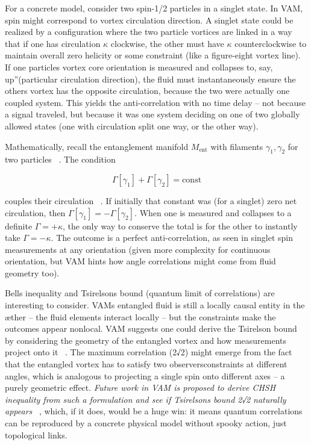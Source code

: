 \documentclass[a4paper, aps,preprint,superscriptaddress, 12pt]{revtex4}
\begin{document}
For a concrete model, consider two spin-1/2 particles in a singlet state. In VAM, spin might correspond to vortex circulation direction. A singlet state could be realized by a configuration where the two particle vortices are linked in a way that if one has circulation $\kappa$ clockwise, the other must have $\kappa$ counterclockwise to maintain overall zero helicity or some constraint (like a figure-eight vortex line). If one particle\rqs s vortex core orientation is measured and collapses to, say, \grqq up\textquotedblright (particular circulation direction), the fluid must instantaneously ensure the other\rqs s vortex has the opposite circulation, because the two were actually one coupled system. This yields the anti-correlation with no time delay – not because a signal traveled, but because it was one system deciding on one of two globally allowed states (one with circulation split one way, or the other way).


Mathematically, recall the entanglement manifold $M_{\text{ent}}$ with filaments ${\gamma_1, \gamma_2}$ for two particles~\cite{Iskandarani2025c} . The condition

\begin{equation}
    \Gamma[\gamma_1] + \Gamma[\gamma_2] = \text{const}
\end{equation}

couples their circulation~\cite{Iskandarani2025c} . If initially that constant was (for a singlet) zero net circulation, then $\Gamma[\gamma_1] = -\Gamma[\gamma_2]$. When one is measured and collapses to a definite $\Gamma = +\kappa$, the only way to conserve the total is for the other to instantly take $\Gamma = -\kappa$. The outcome is a perfect anti-correlation, as seen in singlet spin measurements at any orientation (given more complexity for continuous orientation, but VAM hints how angle correlations might come from fluid geometry too).


Bell\rqs s inequality and Tsirelson\rqs s bound (quantum limit of correlations) are interesting to consider. VAM\rqs s entangled fluid is still a locally causal entity in the æther – the fluid elements interact locally – but the constraints make the outcomes appear nonlocal. VAM suggests one could derive the Tsirelson bound by considering the geometry of the entangled vortex and how measurements project onto it~\cite{Iskandarani2025c} . The maximum correlation (2√2) might emerge from the fact that the entangled vortex has to satisfy two observers\rqs  constraints at different angles, which is analogous to projecting a single spin onto different axes – a purely geometric effect. \textit{Future work in VAM is proposed to derive CHSH inequality from such a formulation and see if Tsirelson\rqs s bound 2√2 naturally appears}~\cite{Iskandarani2025c} , which, if it does, would be a huge win: it means quantum correlations can be reproduced by a concrete physical model without spooky action, just topological links.
\end{document}
